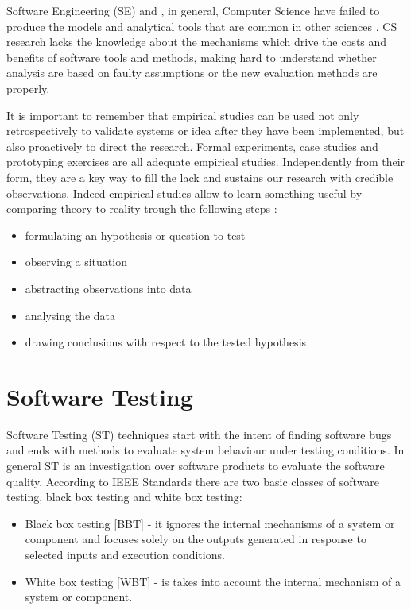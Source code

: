 Software Engineering (SE) and , in general, Computer Science have failed to produce the models and analytical tools that are common in other sciences \cite{Perry:2000:ESS:336512.336586}. CS research lacks the knowledge about the mechanisms which drive the costs and benefits of software tools and methods, making hard to understand whether analysis are  based on faulty assumptions or the new evaluation methods are properly.

It is important to remember that empirical studies can be used not only retrospectively to validate systems or idea after they have been implemented, but also proactively to direct the research. Formal experiments, case studies and prototyping exercises are all adequate empirical studies. Independently from their form, they are a key way to fill the lack and sustains our research with credible observations. Indeed empirical studies allow to learn something useful by comparing theory to reality trough the following steps \cite{Perry:2000:ESS:336512.336586}:
\begin{itemize}
\item  formulating an hypothesis or question to test
\item  observing a situation
\item  abstracting observations into data
\item  analysing the data
\item  drawing conclusions with respect to the tested hypothesis
\end{itemize}

\section{Software Testing}\label{sec:software-testing}
Software Testing (ST) techniques start with the intent of finding software bugs and ends with methods to evaluate system behaviour under testing conditions. In general ST is an investigation over software products to evaluate the software quality. According to IEEE Standards  \cite{IEEEStd610.12-1990:glossary} there are two basic classes of software testing, black box testing and white box testing: 

\begin{itemize}
\item Black box testing [BBT] - it ignores the internal mechanisms of a system or component and focuses solely on the outputs
generated in response to selected inputs and execution conditions.
\item White box testing [WBT] - is takes into account the internal mechanism of a system or component. 
\end{itemize} 

